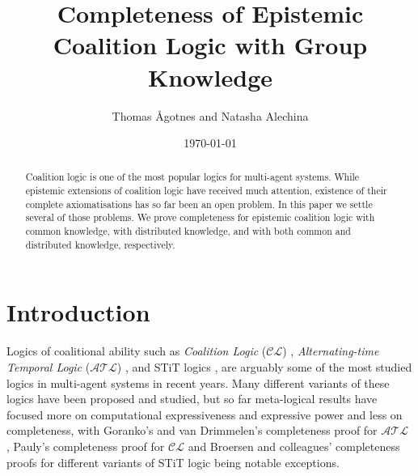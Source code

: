 \documentclass{article}
\newcommand{\acro}[1]{\ensuremath{\mathcal{#1}}}
\begin{document}
\title{Completeness of Epistemic Coalition Logic with Group Knowledge} 
\author{Thomas {\AA}gotnes and Natasha Alechina}
\date{\today}

\maketitle

\begin{abstract}
  Coalition logic is one of the most popular logics for multi-agent
  systems. While epistemic extensions of coalition logic have received
  much attention, existence of their complete axiomatisations
  has so far been an open problem. In this paper we settle several of
  those problems. We prove completeness for epistemic coalition logic
  with common knowledge, with distributed knowledge, and with both
  common and distributed knowledge, respectively.
\end{abstract}


\section{Introduction}

Logics of coalitional ability such as \emph{Coalition Logic}
(\acro{CL}) \cite{pauly:2002a}, \emph{Alternating-time Temporal Logic}
(\acro{ATL}) \cite{Alur2002}, and STiT logics \cite{Belnap88stit}, are
arguably some of the most studied logics in multi-agent systems in
recent years. Many different variants of these logics have been
proposed and studied, but so far meta-logical results have focused
more on computational expressiveness and expressive power and less on
completeness, with Goranko's and van Drimmelen's completeness proof
for \acro{ATL} \cite{goranko:2006a}, Pauly's completeness proof for
\acro{CL} \cite{pauly:2002a} and Broersen and colleagues' completeness
proofs for different variants of STiT logic
\cite{Broersen//:07a,BroersenDALT2008,BroersenHerzigTroquardJANCL2009}
being notable exceptions.
\end{document}

